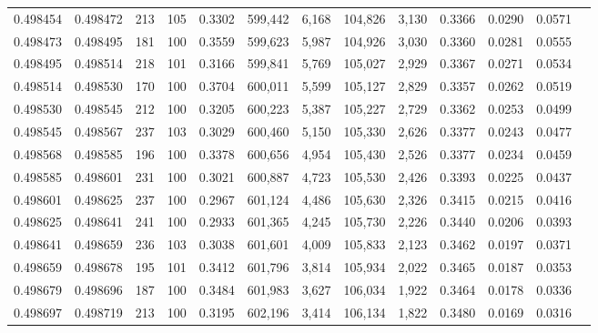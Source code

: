 \begin{tabular}{rrrrrrrrrrrrr}
0.498454 & 0.498472 &   213 & 105 &                                     0.3302 & 599,442 &   6,168 & 104,826 &   3,130 & 0.3366 & 0.0290 & 0.0571 \\
0.498473 & 0.498495 &   181 & 100 &                                     0.3559 & 599,623 &   5,987 & 104,926 &   3,030 & 0.3360 & 0.0281 & 0.0555 \\
0.498495 & 0.498514 &   218 & 101 &                                     0.3166 & 599,841 &   5,769 & 105,027 &   2,929 & 0.3367 & 0.0271 & 0.0534 \\
0.498514 & 0.498530 &   170 & 100 &                                     0.3704 & 600,011 &   5,599 & 105,127 &   2,829 & 0.3357 & 0.0262 & 0.0519 \\
0.498530 & 0.498545 &   212 & 100 &                                     0.3205 & 600,223 &   5,387 & 105,227 &   2,729 & 0.3362 & 0.0253 & 0.0499 \\
0.498545 & 0.498567 &   237 & 103 &                                     0.3029 & 600,460 &   5,150 & 105,330 &   2,626 & 0.3377 & 0.0243 & 0.0477 \\
0.498568 & 0.498585 &   196 & 100 &                                     0.3378 & 600,656 &   4,954 & 105,430 &   2,526 & 0.3377 & 0.0234 & 0.0459 \\
0.498585 & 0.498601 &   231 & 100 &                                     0.3021 & 600,887 &   4,723 & 105,530 &   2,426 & 0.3393 & 0.0225 & 0.0437 \\
0.498601 & 0.498625 &   237 & 100 &                                     0.2967 & 601,124 &   4,486 & 105,630 &   2,326 & 0.3415 & 0.0215 & 0.0416 \\
0.498625 & 0.498641 &   241 & 100 &                                     0.2933 & 601,365 &   4,245 & 105,730 &   2,226 & 0.3440 & 0.0206 & 0.0393 \\
0.498641 & 0.498659 &   236 & 103 &                                     0.3038 & 601,601 &   4,009 & 105,833 &   2,123 & 0.3462 & 0.0197 & 0.0371 \\
0.498659 & 0.498678 &   195 & 101 &                                     0.3412 & 601,796 &   3,814 & 105,934 &   2,022 & 0.3465 & 0.0187 & 0.0353 \\
0.498679 & 0.498696 &   187 & 100 &                                     0.3484 & 601,983 &   3,627 & 106,034 &   1,922 & 0.3464 & 0.0178 & 0.0336 \\
0.498697 & 0.498719 &   213 & 100 &                                     0.3195 & 602,196 &   3,414 & 106,134 &   1,822 & 0.3480 & 0.0169 & 0.0316 \\

\end{tabular}
